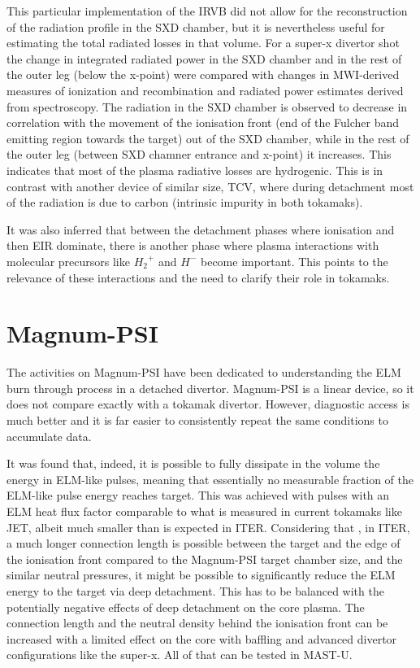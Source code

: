 This particular implementation of the IRVB did not allow for the reconstruction of the radiation profile in the SXD chamber, but it is nevertheless useful for estimating the total radiated losses in that volume. For a super-x divertor shot the change in integrated radiated power in the SXD chamber and in the rest of the outer leg (below the x-point) were compared with changes in MWI-derived measures of ionization and recombination and radiated power estimates derived from spectroscopy. The radiation in the SXD chamber is observed to decrease in correlation with the movement of the ionisation front (end of the Fulcher band emitting region towards the target) out of the SXD chamber, while in the rest of the outer leg (between SXD chamner entrance and x-point) it increases. This indicates that most of the plasma radiative losses are hydrogenic. This is in contrast with another device of similar size, TCV, where during detachment most of the radiation is due to carbon (intrinsic impurity in both tokamaks).

It was also inferred that between the detachment phases where ionisation and then EIR dominate, there is another phase where plasma interactions with molecular precursors like ${H_2}^+$ and $H^-$ become important. This points to the relevance of these interactions and the need to clarify their role in tokamaks.


\section{Magnum-PSI}

The activities on Magnum-PSI have been dedicated to understanding the ELM burn through process in a detached divertor. Magnum-PSI is a linear device, so it does not compare exactly with a tokamak divertor. However, diagnostic access is much better and it is far easier to consistently repeat the same conditions to accumulate data.

It was found that, indeed, it is possible to fully dissipate in the volume the energy in ELM-like pulses, meaning that essentially no measurable fraction of the ELM-like pulse energy reaches target. This was achieved with pulses with an ELM heat flux factor comparable to what is measured in current tokamaks like JET, albeit much smaller than is expected in ITER. Considering that , in ITER, a much longer connection length is possible between the target and the edge of the ionisation front compared to the Magnum-PSI target chamber size, and the similar neutral pressures, it might be possible to significantly reduce the ELM energy to the target via deep detachment. This has to be balanced with the potentially negative effects of deep detachment on the core plasma. The connection length and the neutral density behind the ionisation front can be increased with a limited effect on the core with baffling and advanced divertor configurations like the super-x. All of that can be tested in MAST-U.

